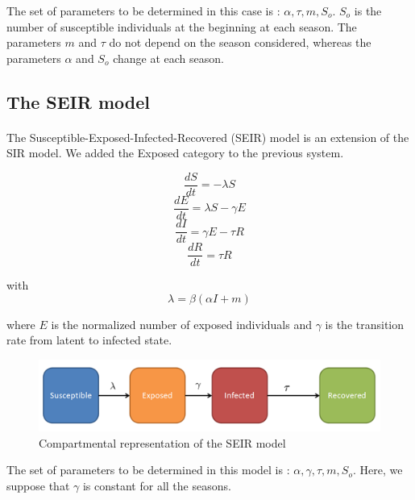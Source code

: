 \documentclass[11pt, a4paper]{article}
\begin{document}

The set of parameters to be determined in this case is : $ { \alpha, \tau, m, S_o}$. $S_o$ is the number of susceptible individuals at the beginning at each season. The parameters $m$ and $\tau$ do not depend on the season considered, whereas the parameters $\alpha$ and $S_o$ change at each season.

\subsection{The SEIR model}
\paragraph{}
The Susceptible-Exposed-Infected-Recovered (SEIR) model is an extension of the SIR model. We added the Exposed category to the previous system.

\begin{equation}
\frac{dS}{dt} = - \lambda S
\end{equation}
\begin{equation}
\frac{dE}{dt} = \lambda S - \gamma E
\end{equation}
\begin{equation}
\frac{dI}{dt} = \gamma E - \tau R
\end{equation}
\begin{equation}
\frac{dR}{dt} = \tau R
\end{equation}

with \[ \lambda = \beta (\alpha I + m) \]

where $E$ is the normalized number of exposed individuals and $\gamma$ is the transition rate from latent to infected state.

\begin{figure}[h]
\center
   \includegraphics[width = \textwidth]{picture2.png}
   \caption{\label{2} Compartmental representation of the SEIR model}
\end{figure}


The set of parameters to be determined in this model is : $ { \alpha, \gamma, \tau, m, S_o}$. Here, we suppose that $\gamma$ is constant for all the seasons.
\end{document}
